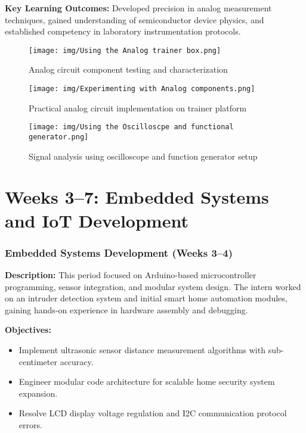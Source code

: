 \documentclass[12pt,a4paper]{report}
\begin{document}
\noindent\textbf{Key Learning Outcomes:} Developed precision in analog measurement techniques, gained understanding of semiconductor device physics, and established competency in laboratory instrumentation protocols.

\begin{figure}[H]
\centering
\texttt{[image: img/Using the Analog trainer box.png]}
\caption{Analog circuit component testing and characterization}
\label{fig:analog-components}
\end{figure}

\begin{figure}[H]
\centering
\texttt{[image: img/Experimenting with Analog components.png]}
\caption{Practical analog circuit implementation on trainer platform}
\label{fig:analog-trainer}
\end{figure}

\begin{figure}[H]
\centering
\texttt{[image: img/Using the Oscilloscpe and functional generator.png]}
\caption{Signal analysis using oscilloscope and function generator setup}
\label{fig:oscilloscope-setup}
\end{figure}

\section{Weeks 3--7: Embedded Systems and IoT Development}

\subsubsection{Embedded Systems Development (Weeks 3--4)}

\textbf{Description:} This period focused on Arduino-based microcontroller programming, sensor integration, and modular system design. The intern worked on an intruder detection system and initial smart home automation modules, gaining hands-on experience in hardware assembly and debugging.

\textbf{Objectives:}
\begin{itemize}
    \item Implement ultrasonic sensor distance measurement algorithms with sub-centimeter accuracy.
    \item Engineer modular code architecture for scalable home security system expansion.
    \item Resolve LCD display voltage regulation and I2C communication protocol errors.
\end{itemize}
\end{document}
